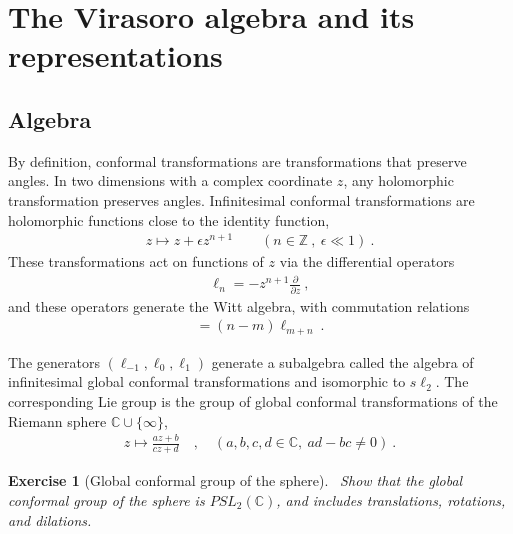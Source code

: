 \documentclass[12pt, a4paper]{article}
\theoremstyle{break}
\newtheorem{exo}{Exercise}[section]
\begin{document}
\section{The Virasoro algebra and its representations}

\subsection{Algebra}

By definition, conformal transformations are transformations that preserve angles. 
In two dimensions with a complex coordinate $z$, any holomorphic transformation preserves angles.
Infinitesimal conformal transformations are holomorphic functions close to the identity function, 
\begin{align}
 z \mapsto z + \epsilon z^{n+1}\qquad (n\in\mathbb{Z}\ , \ \epsilon\ll 1) \ .
\end{align}
These transformations act on functions of $z$ via the differential operators 
\begin{align}
 \ell_n = -z^{n+1}\frac{\partial}{\partial z}\ ,
\end{align}
and these operators generate the Witt algebra, with commutation relations
\begin{align}
 [\ell_n,\ell_m ] = (n-m)\ell_{m+n}\ .
\end{align}

\begin{tcolorbox}
The generators $(\ell_{-1},\ell_0,\ell_1)$ generate a subalgebra called the algebra of infinitesimal global conformal transformations and isomorphic to $s\ell_2$.  The corresponding Lie group is the group of global conformal transformations of 
the Riemann sphere $\mathbb{C}\cup \{\infty\}$,
\begin{align}
 z \mapsto \frac{az+b}{cz+d}\quad , \quad (a,b,c,d\in \mathbb{C},\ ad-bc\neq 0)\ .
\end{align}


\begin{exo}[Global conformal group of the sphere]
 ~\label{exo:sphere}
Show that the global conformal group of the sphere is $PSL_2(\mathbb{C})$, and includes translations, rotations, and dilations. 
\end{exo}
\end{tcolorbox}
\end{document}
